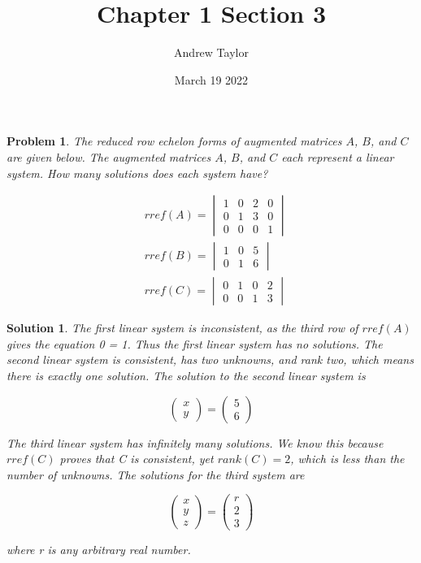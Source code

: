 \documentclass{article}
\title{Chapter 1 Section 3}
\author{Andrew Taylor}
\date{March 19 2022}
\newtheorem{problem}{Problem}
\newtheorem*{solution}{Solution}
\begin{document}
\maketitle

\begin{problem}
The reduced row echelon forms of augmented matrices $A$, $B$, and $C$ are given below. The augmented matrices $A$, $B$, and $C$ each represent a linear system. How many solutions does each system have?

\begin{align*}
&rref(A) = \begin{vmatrix}
1 & 0 & 2 & 0 \\
0 & 1 & 3 & 0 \\
0 & 0 & 0 & 1
\end{vmatrix} \\
&rref(B) = \begin{vmatrix}
1 & 0 & 5 \\
0 & 1 & 6
\end{vmatrix} \\
&rref(C) = \begin{vmatrix}
0 & 1 & 0 & 2 \\
0 & 0 & 1 & 3
\end{vmatrix}
\end{align*}

\end{problem}

\begin{solution}
The first linear system is inconsistent, as the third row of $rref(A)$ gives the equation 0 = 1. Thus the first linear system has no solutions. The second linear system is consistent, has two unknowns, and rank two, which means there is exactly one solution. The solution to the second linear system is

\begin{equation*}
\begin{pmatrix}
x \\ y
\end{pmatrix}
=
\begin{pmatrix}
5 \\ 6
\end{pmatrix}
\end{equation*}

The third linear system has infinitely many solutions. We know this because $rref(C)$ proves that C is consistent, yet $rank(C) = 2$, which is less than the number of unknowns. The solutions for the third system are 

\begin{equation*}
\begin{pmatrix}
x \\ y \\ z
\end{pmatrix}
=
\begin{pmatrix}
r \\ 2 \\ 3
\end{pmatrix}
\end{equation*}

where r is any arbitrary real number.

\end{solution}
\end{document}
